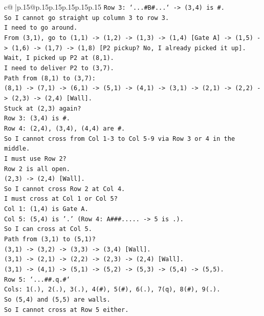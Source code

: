\documentclass{article}
\begin{document}
{\begin{supertabular}{c@{$\;$}|p{.15\linewidth}@{}p{.15\linewidth}p{.15\linewidth}p{.15\linewidth}p{.15\linewidth}p{.15\linewidth}}
{{{\texttt{Row 3: `...\#B\#...` {-}> (3,4) is \#.} \\
\texttt{So I cannot go straight up column 3 to row 3.} \\
\texttt{I need to go around.} \\
\texttt{From (3,1), go to (1,1) {-}> (1,2) {-}> (1,3) {-}> (1,4) {[}Gate A{]} {-}> (1,5) {-}> (1,6) {-}> (1,7) {-}> (1,8) {[}P2 pickup? No, I already picked it up{]}.} \\
\texttt{Wait, I picked up P2 at (8,1).} \\
\texttt{I need to deliver P2 to (3,7).} \\
\texttt{Path from (8,1) to (3,7):} \\
\texttt{(8,1) {-}> (7,1) {-}> (6,1) {-}> (5,1) {-}> (4,1) {-}> (3,1) {-}> (2,1) {-}> (2,2) {-}> (2,3) {-}> (2,4) {[}Wall{]}.} \\
\texttt{Stuck at (2,3) again?} \\
\texttt{Row 3: (3,4) is \#.} \\
\texttt{Row 4: (2,4), (3,4), (4,4) are \#.} \\
\texttt{So I cannot cross from Col 1{-}3 to Col 5{-}9 via Row 3 or 4 in the middle.} \\
\texttt{I must use Row 2?} \\
\texttt{Row 2 is all open.} \\
\texttt{(2,3) {-}> (2,4) {[}Wall{]}.} \\
\texttt{So I cannot cross Row 2 at Col 4.} \\
\texttt{I must cross at Col 1 or Col 5?} \\
\texttt{Col 1: (1,4) is Gate A.} \\
\texttt{Col 5: (5,4) is '.' (Row 4: A\#\#\#..... {-}> 5 is .).} \\
\texttt{So I can cross at Col 5.} \\
\texttt{Path from (3,1) to (5,1)?} \\
\texttt{(3,1) {-}> (3,2) {-}> (3,3) {-}> (3,4) {[}Wall{]}.} \\
\texttt{(3,1) {-}> (2,1) {-}> (2,2) {-}> (2,3) {-}> (2,4) {[}Wall{]}.} \\
\texttt{(3,1) {-}> (4,1) {-}> (5,1) {-}> (5,2) {-}> (5,3) {-}> (5,4) {-}> (5,5).} \\
\texttt{Row 5: `...\#\#.q.\#`} \\
\texttt{Cols: 1(.), 2(.), 3(.), 4(\#), 5(\#), 6(.), 7(q), 8(\#), 9(.).} \\
\texttt{So (5,4) and (5,5) are walls.} \\
\texttt{So I cannot cross at Row 5 either.} \\
}}}
\end{supertabular}}
\end{document}
